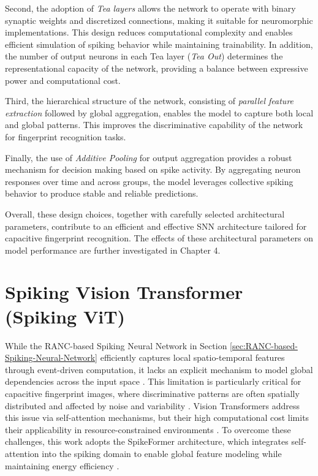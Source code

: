 \documentclass[../main.tex]{subfiles}
\begin{document}
Second, the adoption of \textit{Tea layers} allows the network to operate with binary synaptic weights and discretized connections, making it suitable for neuromorphic implementations. This design reduces computational complexity and enables efficient simulation of spiking behavior while maintaining trainability. In addition, the number of output neurons in each Tea layer (\textit{Tea Out}) determines the representational capacity of the network, providing a balance between expressive power and computational cost.

Third, the hierarchical structure of the network, consisting of \textit{parallel feature extraction} followed by global aggregation, enables the model to capture both local and global patterns. This improves the discriminative capability of the network for fingerprint recognition tasks.

Finally, the use of \textit{Additive Pooling} for output aggregation provides a robust mechanism for decision making based on spike activity. By aggregating neuron responses over time and across groups, the model leverages collective spiking behavior to produce stable and reliable predictions.

Overall, these design choices, together with carefully selected architectural parameters, contribute to an efficient and effective SNN architecture tailored for capacitive fingerprint recognition. The effects of these architectural parameters on model performance are further investigated in Chapter 4.

\section{Spiking Vision Transformer (Spiking ViT)}
While the RANC-based Spiking Neural Network in Section \ref{sec:RANC-based-Spiking-Neural-Network} efficiently captures local spatio-temporal features through event-driven computation, it lacks an explicit mechanism to model global dependencies across the input space \cite{RANC}. This limitation is particularly critical for capacitive fingerprint images, where discriminative patterns are often spatially distributed and affected by noise and variability \cite{CapfingerId}. Vision Transformers address this issue via self-attention mechanisms, but their high computational cost limits their applicability in resource-constrained environments \cite{dosovitskiy2021imageworth16x16words}. To overcome these challenges, this work adopts the SpikeFormer architecture, which integrates self-attention into the spiking domain to enable global feature modeling while maintaining energy efficiency \cite{zhou2023spikeformer}.
\end{document}
